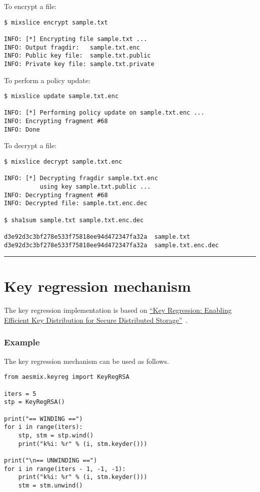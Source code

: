 To encrypt a file:

\begin{verbatim}
$ mixslice encrypt sample.txt

INFO: [*] Encrypting file sample.txt ...
INFO: Output fragdir:   sample.txt.enc
INFO: Public key file:  sample.txt.public
INFO: Private key file: sample.txt.private
\end{verbatim}

To perform a policy update:

\begin{verbatim}
$ mixslice update sample.txt.enc

INFO: [*] Performing policy update on sample.txt.enc ...
INFO: Encrypting fragment #68
INFO: Done
\end{verbatim}

To decrypt a file:

\begin{verbatim}
$ mixslice decrypt sample.txt.enc

INFO: [*] Decrypting fragdir sample.txt.enc
          using key sample.txt.public ...
INFO: Decrypting fragment #68
INFO: Decrypted file: sample.txt.enc.dec

$ sha1sum sample.txt sample.txt.enc.dec

d3e92d3c3bf278e533f75818ee94d472347fa32a  sample.txt
d3e92d3c3bf278e533f75818ee94d472347fa32a  sample.txt.enc.dec
\end{verbatim}

\begin{center}\rule{0.5\linewidth}{\linethickness}\end{center}

\section{Key regression mechanism}\label{key-regression-mechanism}

The key regression implementation is based on
\href{https://eprint.iacr.org/2005/303.pdf}{``Key Regression: Enabling
Efficient Key Distribution for Secure Distributed Storage''}~\cite{fkk06}.

\subsubsection{Example}

The key regression mechanism can be used as follows.

\begin{verbatim}
from aesmix.keyreg import KeyRegRSA

iters = 5
stp = KeyRegRSA()

print("== WINDING ==")
for i in range(iters):
    stp, stm = stp.wind()
    print("k%i: %r" % (i, stm.keyder()))

print("\n== UNWINDING ==")
for i in range(iters - 1, -1, -1):
    print("k%i: %r" % (i, stm.keyder()))
    stm = stm.unwind()
\end{verbatim}